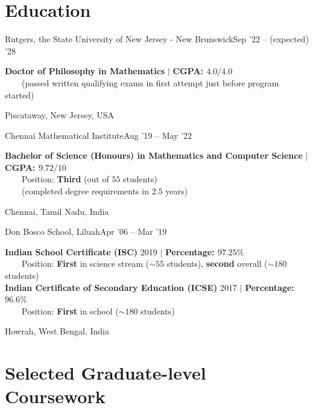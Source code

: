 \section{Education}
\resumeSubheading
{Rutgers, the State University of New Jersey - New Brunswick}{Sep '22 -- (expected) '28}{\begin{minipage}{15cm} 
\color{grey}\textbf{Doctor of Philosophy in Mathematics}  $|$ \textbf{CGPA: $4.0/4.0$}
\\$\phantom{\qquad}$(passed written qualifying exams in first attempt just before program started) \end{minipage}
}{Piscataway, New Jersey, USA}
\vspace{-5pt}

\resumeSubheading
{Chennai Mathematical Institute}{Aug '19 -- May '22}
{\begin{minipage}{15cm} \color{grey}\textbf{Bachelor of Science (Honours) in Mathematics and Computer Science} $|$ \textbf{CGPA: $9.72/10$} \\
$\phantom{\qquad}$Position: \textbf{Third} (out of $55$ students)\\
$\phantom{\qquad}$(completed degree requirements in $2.5$ years) \end{minipage}
}{Chennai, Tamil Nadu, India}
\vspace{-5pt}
      
\resumeSubheading
{Don Bosco School, Liluah}{Apr '06 -- Mar '19}
{\begin{minipage}{15cm} \color{grey}\textbf{Indian School Certificate (ISC)} 2019 $|$ \textbf{Percentage: $97.25\%$} \\
$\phantom{\qquad}$Position: \textbf{First} in science stream ($\sim55$ students), \textbf{second} overall ($\sim180$ students) \\ 
\textbf{Indian Certificate of Secondary Education (ICSE)} 2017 $|$ \textbf{Percentage: $96.6\%$} \\
$\phantom{\qquad}$Position: \textbf{First} in school ($\sim180$ students) \end{minipage}
}{Howrah, West Bengal, India}
\vspace{-15pt}

\section{Selected Graduate-level Coursework}


